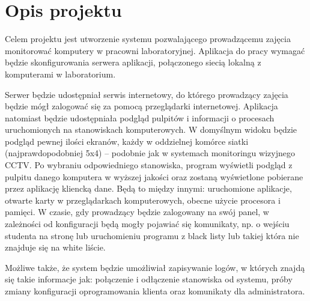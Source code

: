 \section {Opis projektu}
Celem projektu jest utworzenie systemu pozwalającego prowadzącemu zajęcia monitorować komputery w pracowni laboratoryjnej. Aplikacja do pracy wymagać będzie skonfigurowania serwera aplikacji, połączonego siecią lokalną z komputerami w laboratorium. 

Serwer będzie udostępniał serwis internetowy, do którego prowadzący zajęcia będzie mógł zalogować się za pomocą przeglądarki internetowej. Aplikacja natomiast będzie udostępniała podgląd pulpitów i informacji o procesach uruchomionych na stanowiskach komputerowych. W domyślnym widoku będzie podgląd pewnej ilości ekranów, każdy w oddzielnej komórce siatki (najprawdopodobniej 5x4) -- podobnie jak w systemach monitoringu wizyjnego CCTV. Po wybraniu odpowiedniego stanowiska, program wyświetli podgląd z pulpitu danego komputera w wyższej jakości oraz zostaną wyświetlone pobierane przez aplikację kliencką dane. Będą to między innymi: uruchomione aplikacje, otwarte karty w przeglądarkach komputerowych, obecne użycie procesora i pamięci. W czasie, gdy prowadzący będzie zalogowany na swój panel, w zależności od konfiguracji będą mogły pojawiać się komunikaty, np. o wejściu studenta na stronę lub uruchomieniu programu z black listy lub takiej która nie znajduje się na white liście. 

Możliwe także, że system będzie umożliwiał zapisywanie logów, w których znajdą się takie informacje jak: połączenie i odłączenie stanowiska od systemu, próby zmiany konfiguracji oprogramowania klienta oraz komunikaty dla administratora.



